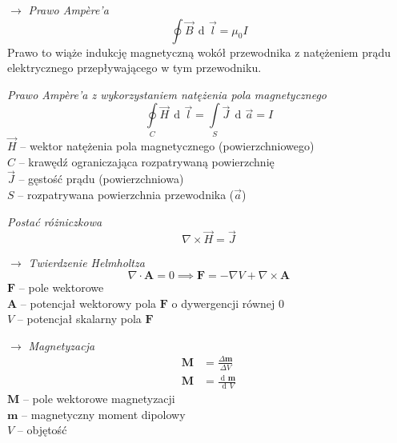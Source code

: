 \documentclass[12pt]{article}
\newenvironment{wzor}[1]{\par{\Large $\longrightarrow$ \textit{#1}}}
    {\newline {\color{grey} \rule{\linewidth}{0.3pt}}}
\DeclareMathOperator{\der}{\operatorname{d}\!}
\begin{document}
\begin{wzor}{Prawo Ampère'a}
    \begin{equation}
        \oint \Vec{B} \, \der\Vec{l} = \mu_0 I
    \end{equation}
    Prawo to wiąże indukcję magnetyczną wokół przewodnika z natężeniem prądu elektrycznego
    przepływającego w tym przewodniku.
    
    \newpage
    
    \par \textit{Prawo Ampère'a z wykorzystaniem natężenia pola magnetycznego}
    \begin{equation}
        \oint\limits_C \Vec{H} \, \der\Vec{l} = \int\limits_S \Vec{J} \, \der\Vec{a} = I
    \end{equation}
    $\Vec{H}$ -- wektor natężenia pola magnetycznego (powierzchniowego)\\
    $C$ -- krawędź ograniczająca rozpatrywaną powierzchnię\\
    $\Vec{J}$ -- gęstość prądu (powierzchniowa)\\
    $S$ -- rozpatrywana powierzchnia przewodnika ($\Vec{a}$)
    
    \par \textit{Postać różniczkowa}
    \begin{equation}
        \nabla \times \Vec{H} = \Vec{J}
    \end{equation}
\end{wzor}

\begin{wzor}{Twierdzenie Helmholtza}
    \begin{equation}
        \nabla \cdot \mathbf{A} = 0 \implies \mathbf{F} = - \nabla V + \nabla \times \mathbf{A}
    \end{equation}
    $\mathbf{F}$ -- pole wektorowe\\
    $\mathbf{A}$ -- potencjał wektorowy pola $\mathbf{F}$ o dywergencji równej 0\\
    $V$ -- potencjał skalarny pola $\mathbf{F}$
\end{wzor}

\begin{wzor}{Magnetyzacja}
    \begin{equation}
        \begin{split}
            \mathbf{M} &= \frac{\Delta \mathbf{m}}{\Delta V}\\
            \mathbf{M} &= \frac{\der \mathbf{m}}{\der V}
        \end{split}
    \end{equation}
    $\mathbf{M}$ -- pole wektorowe magnetyzacji\\
    $\mathbf{m}$ -- magnetyczny moment dipolowy\\
    $V$ -- objętość
\end{wzor}
\end{document}

